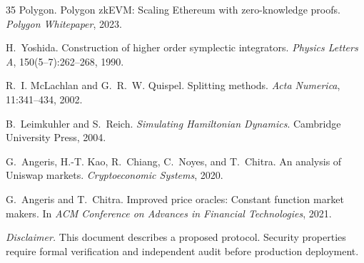 \begin{thebibliography}{35}
Polygon.
\newblock Polygon {zkEVM}: Scaling {Ethereum} with zero-knowledge proofs.
\newblock \emph{Polygon Whitepaper}, 2023.

H.~Yoshida.
\newblock Construction of higher order symplectic integrators.
\newblock \emph{Physics Letters A}, 150(5--7):262--268, 1990.

R.~I. McLachlan and G.~R.~W. Quispel.
\newblock Splitting methods.
\newblock \emph{Acta Numerica}, 11:341--434, 2002.

B.~Leimkuhler and S.~Reich.
\newblock \emph{Simulating Hamiltonian Dynamics}.
\newblock Cambridge University Press, 2004.

G.~Angeris, H.-T. Kao, R.~Chiang, C.~Noyes, and T.~Chitra.
\newblock An analysis of {Uniswap} markets.
\newblock \emph{Cryptoeconomic Systems}, 2020.

G.~Angeris and T.~Chitra.
\newblock Improved price oracles: Constant function market makers.
\newblock In \emph{ACM Conference on Advances in Financial Technologies}, 2021.

\end{thebibliography}

\vspace{1em}
\noindent\textit{Disclaimer.} This document describes a proposed protocol. Security properties require formal verification and independent audit before production deployment.

